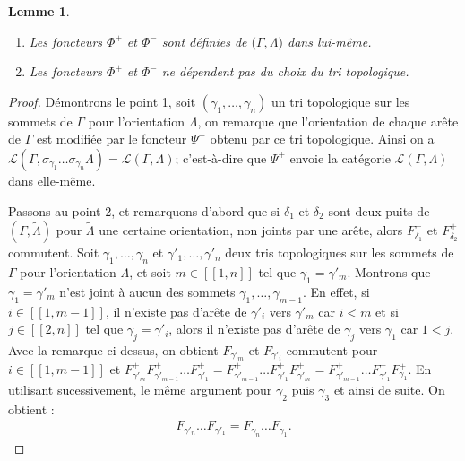 \documentclass[a4paper,11pt]{article}
\newtheorem{lm}[thm]{Lemme}%
\begin{document}
\begin{lm}
\label{lem2}
  \begin{enumerate}
  \item Les foncteurs $\Phi^{+}$ et $\Phi^{-}$ sont définies de $\mathscr(\Gamma, \Lambda)$ dans lui-même.
  \item Les foncteurs $\Phi^{+}$ et $\Phi^{-}$ ne dépendent pas du choix du tri topologique.
  \end{enumerate}
\end{lm}
\begin{proof}
  Démontrons le point 1, soit $(\gamma_{1}, \dots, \gamma_{n})$ un tri topologique sur les sommets de $\Gamma$ pour l'orientation $\Lambda$, on remarque que l'orientation de chaque arête de $\Gamma$ est modifiée par le foncteur $\Psi^{+}$ obtenu par ce tri topologique. Ainsi on a $\mathscr L(\Gamma,\sigma_{\gamma_{1}} \dots \sigma_{\gamma_{n}}\Lambda) = \mathscr L(\Gamma,\Lambda)$; c'est-à-dire que $\Psi^{+}$ envoie la catégorie $\mathscr L(\Gamma,\Lambda)$ dans elle-même.

  Passons au point 2, et remarquons d'abord que si $\delta_{1}$ et $\delta_{2}$ sont deux puits de $(\Gamma,\widetilde \Lambda)$ pour $\widetilde \Lambda$ une certaine orientation, non joints par une arête, alors $F^{+}_{\delta_{1}}$ et $F^{+}_{\delta_{2}}$ commutent. 
Soit $\gamma_{1}, \dots, \gamma_{n}$ et $\gamma'_{1}, \dots , \gamma'_{n}$ deux tris topologiques sur les sommets de $\Gamma$ pour l'orientation $\Lambda$, et soit $m \in [\![1,n]\!]$ tel que $\gamma_{1}= \gamma'_{m}$. Montrons que $\gamma_{1} = \gamma'_{m}$ n'est joint à aucun des sommets $\gamma_{1},\dots, \gamma_{m-1}$. En effet, si $i \in [\![1,m-1]\!]$, il n'existe pas d'arête de $\gamma'_{i}$ vers $\gamma'_{m}$ car $i<m$ et si $j \in [\![2,n]\!]$ tel que $\gamma_{j} = \gamma'_{i}$, alors il n'existe pas d'arête de $\gamma_{j}$ vers $\gamma_{1}$ car $1<j$. Avec la remarque ci-dessus, on obtient $F_{\gamma'_{m}}$ et $F_{\gamma'_{i}}$ commutent pour $i \in [\![1,m-1]\!]$ et $F^{+}_{\gamma'_{m}}F^{+}_{\gamma'_{m-1}}\dots F^{+}_{\gamma'_{1}} = F^{+}_{\gamma'_{m-1}}\dots F^{+}_{\gamma'_{1}} F^{+}_{\gamma'_{m}} = F^{+}_{\gamma'_{m-1}}\dots F^{+}_{\gamma'_{1}}F^{+}_{\gamma_{1}}$. En utilisant sucessivement, le même argument pour $\gamma_{2}$ puis $\gamma_{3}$ et ainsi de suite. On obtient : 
\begin{eqnarray*}%
  F_{\gamma'_{n}}\dots F_{\gamma'_{1}} = F_{\gamma_{n}} \dots F_{\gamma_{1}}.
\end{eqnarray*}
\end{proof}
\end{document}
